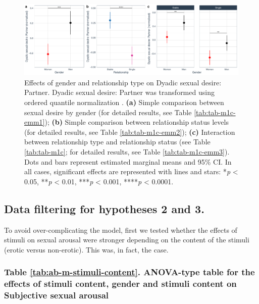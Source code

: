 \documentclass[
  bookmarksnumbered]{article}
\begin{document}
\begin{figure}
\centering
\includegraphics{Sexual_Desire_Arousal_V2_files/figure-latex/fig-h1c-1.pdf}
\caption{\label{fig:fig-h1c}Effects of gender and relationship type on Dyadic sexual desire: Partner. Dyadic sexual desire: Partner was transformed using ordered quantile normalization \autocite{petersonOrderedQuantileNormalization2020a}. \textbf{(a)} Simple comparison between sexual desire by gender (for detailed results, see Table \ref{tab:tab-m1c-emm1}); \textbf{(b)} Simple comparison between relationship status levels (for detailed results, see Table \ref{tab:tab-m1c-emm2}); \textbf{(c)} Interaction between relationship type and relationship status (see Table \ref{tab:tab-m1c}; for detailed results, see Table \ref{tab:tab-m1c-emm3}). Dots and bars represent estimated marginal means and 95\% CI. In all cases, significant effects are represented with lines and stars: *\emph{p} \textless{} 0.05, **\emph{p} \textless{} 0.01, ***\emph{p} \textless{} 0.001, ****\emph{p} \textless{} 0.0001.}
\end{figure}

\subsection{Data filtering for hypotheses 2 and 3.}\label{datfil2and3}

To avoid over-complicating the model, first we tested whether the effects of stimuli on sexual arousal were stronger depending on the content of the stimuli (erotic versus non-erotic). This was, in fact, the case.

\subsubsection{Table \ref{tab:ab-m-stimuli-content}. ANOVA-type table for the effects of stimuli content, gender and stimuli content on Subjective sexual arousal}\label{table-reftabab-m-stimuli-content.-anova-type-table-for-the-effects-of-stimuli-content-gender-and-stimuli-content-on-subjective-sexual-arousal}
\end{document}
